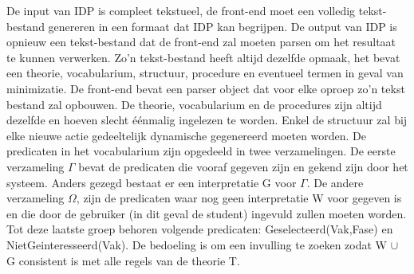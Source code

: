 De input van IDP is compleet tekstueel, de front-end moet een volledig tekst-bestand genereren in een formaat dat IDP kan begrijpen. De output van IDP is opnieuw een tekst-bestand dat de front-end zal moeten parsen om het resultaat te kunnen verwerken. Zo'n tekst-bestand heeft altijd dezelfde opmaak, het bevat een theorie, vocabularium, structuur, procedure en eventueel termen in geval van minimizatie. De front-end bevat een parser object dat voor elke oproep zo'n tekst bestand zal opbouwen. De theorie, vocabularium en de procedures zijn altijd dezelfde en hoeven slecht \'{e}\'{e}nmalig ingelezen te worden. Enkel de structuur zal bij elke nieuwe actie gedeeltelijk dynamische gegenereerd moeten worden. De predicaten in het vocabularium zijn opgedeeld in twee verzamelingen. De eerste verzameling $\Gamma$ bevat de predicaten die vooraf gegeven zijn en gekend zijn door het systeem. Anders gezegd bestaat er een interpretatie G voor $\Gamma$. De andere verzameling $\Omega$, zijn de predicaten waar nog geen interpretatie W voor gegeven is en die door de gebruiker (in dit geval de student) ingevuld zullen moeten worden. Tot deze laatste groep behoren volgende predicaten: Geselecteerd(Vak,Fase) en NietGeinteresseerd(Vak). De bedoeling is om een invulling te zoeken zodat W $\cup$ G consistent is met alle regels van de theorie T.